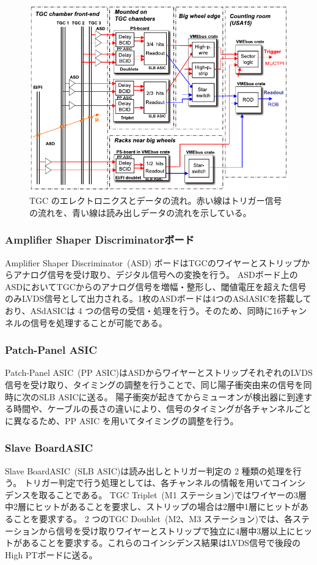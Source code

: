 \begin{figure}[tb]
  \centering
  \includegraphics[clip, width=14cm]{fig/3/electronics.pdf}
  \caption{TGC のエレクトロニクスとデータの流れ\cite{Aad:1129811}。赤い線はトリガー信号の流れを、青い線は読み出しデータの流れを示している。}
  \label{fig:TGC_electro}
\end{figure}

\subsubsection{Amplifier Shaper Discriminatorボード}
Amplifier Shaper Discriminator~(ASD) ボードはTGCのワイヤーとストリップからアナログ信号を受け取り、デジタル信号への変換を行う。
ASDボード上のASDにおいてTGCからのアナログ信号を増幅・整形し、閾値電圧を超えた信号のみLVDS信号として出力される。1枚のASDボードは4つのASdASICを搭載しており、ASdASICは 4 つの信号の受信・処理を行う。そのため、同時に16チャンネルの信号を処理することが可能である。

\subsubsection{Patch-Panel ASIC}
Patch-Panel ASIC~(PP ASIC)はASDからワイヤーとストリップそれぞれのLVDS信号を受け取り、タイミングの調整を行うことで、同じ陽子衝突由来の信号を同時に次のSLB ASICに送る。
陽子衝突が起きてからミューオンが検出器に到達する時間や、ケーブルの長さの違いにより、信号のタイミングが各チャンネルごとに異なるため、PP ASIC を用いてタイミングの調整を行う。

\subsubsection{Slave BoardASIC}
Slave BoardASIC~(SLB ASIC)は読み出しとトリガー判定の 2 種類の処理を行う。
トリガー判定で行う処理としては、各チャンネルの情報を用いてコインシデンスを取ることである。
TGC Triplet~(M1 ステーション)ではワイヤーの3層中2層にヒットがあることを要求し、ストリップの場合は2層中1層にヒットがあることを要求する。
2 つのTGC Doublet~(M2、M3 ステーション)では、各ステーションから信号を受け取りワイヤーとストリップで独立に4層中3層以上にヒットがあることを要求する。これらのコインシデンス結果はLVDS信号で後段のHigh PTボードに送る。


